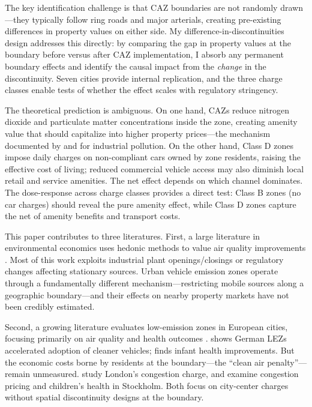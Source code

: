 \documentclass[12pt]{article}
\begin{document}
The key identification challenge is that CAZ boundaries are not randomly drawn---they typically follow ring roads and major arterials, creating pre-existing differences in property values on either side. My difference-in-discontinuities design addresses this directly: by comparing the gap in property values at the boundary before versus after CAZ implementation, I absorb any permanent boundary effects and identify the causal impact from the \textit{change} in the discontinuity. Seven cities provide internal replication, and the three charge classes enable tests of whether the effect scales with regulatory stringency.

The theoretical prediction is ambiguous. On one hand, CAZs reduce nitrogen dioxide and particulate matter concentrations inside the zone, creating amenity value that should capitalize into higher property prices---the mechanism documented by \citet{chay2005} and \citet{currie2015} for industrial pollution. On the other hand, Class D zones impose daily charges on non-compliant cars owned by zone residents, raising the effective cost of living; reduced commercial vehicle access may also diminish local retail and service amenities. The net effect depends on which channel dominates. The dose-response across charge classes provides a direct test: Class B zones (no car charges) should reveal the pure amenity effect, while Class D zones capture the net of amenity benefits and transport costs.

This paper contributes to three literatures. First, a large literature in environmental economics uses hedonic methods to value air quality improvements \citep{rosen1974, chay2005, bajari2012, currie2015, barwick2024}. Most of this work exploits industrial plant openings/closings or regulatory changes affecting stationary sources. Urban vehicle emission zones operate through a fundamentally different mechanism---restricting mobile sources along a geographic boundary---and their effects on nearby property markets have not been credibly estimated.

Second, a growing literature evaluates low-emission zones in European cities, focusing primarily on air quality and health outcomes \citep{gehrsitz2017, wolff2014, holman2015}. \citet{wolff2014} shows German LEZs accelerated adoption of cleaner vehicles; \citet{gehrsitz2017} finds infant health improvements. But the economic costs borne by residents at the boundary---the ``clean air penalty''---remain unmeasured. \citet{green2020} study London's congestion charge, and \citet{simeonova2021} examine congestion pricing and children's health in Stockholm. Both focus on city-center charges without spatial discontinuity designs at the boundary.
\end{document}
